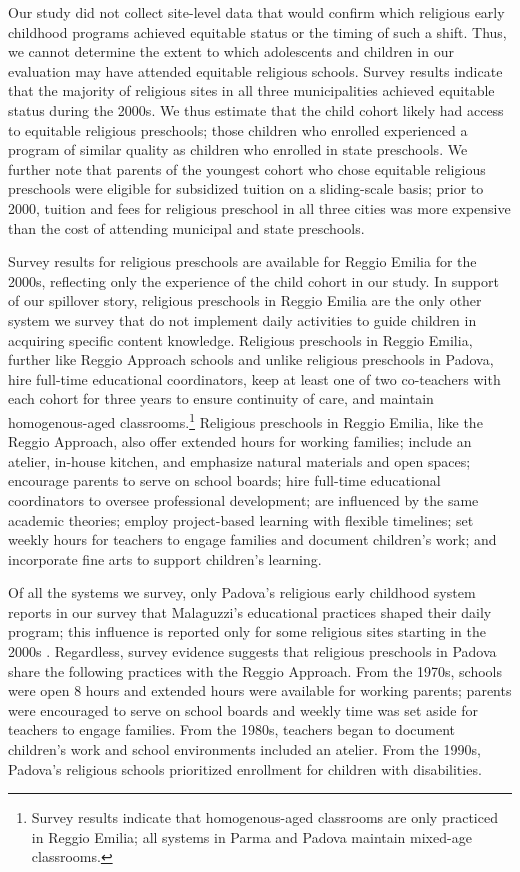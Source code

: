 Our study did not collect site-level data that would confirm which religious early childhood programs achieved equitable status or the timing of such a shift. Thus, we cannot determine the extent to which adolescents and children in our evaluation may have attended equitable religious schools. Survey results indicate that the majority of religious sites in all three municipalities achieved equitable status during the 2000s. We thus estimate that the child cohort likely had access to equitable religious preschools; those children who enrolled experienced a program of similar quality as children who enrolled in state preschools. We further note that parents of the youngest cohort who chose equitable religious preschools were eligible for subsidized tuition on a sliding-scale basis; prior to 2000, tuition and fees for religious preschool in all three cities was more expensive than the cost of attending municipal and state preschools.

Survey results for religious preschools are available for Reggio Emilia for the 2000s, reflecting only the experience of the child cohort in our study. In support of our spillover story, religious preschools in Reggio Emilia are the only other system we survey that do not implement daily activities to guide children in acquiring specific content knowledge. Religious preschools in Reggio Emilia, further like Reggio Approach schools and unlike religious preschools in Padova, hire full-time educational coordinators, keep at least one of two co-teachers with each cohort for three years to ensure continuity of care, and maintain homogenous-aged classrooms.\footnote{Survey results indicate that homogenous-aged classrooms are only practiced in Reggio Emilia; all systems in Parma and Padova maintain mixed-age classrooms.} Religious preschools in Reggio Emilia, like the Reggio Approach, also offer extended hours for working families; include an atelier, in-house kitchen, and emphasize natural materials and open spaces; encourage parents to serve on school boards; hire full-time educational coordinators to oversee professional development; are influenced by the same academic theories; employ project-based learning with flexible timelines; set weekly hours for teachers to engage families and document children's work; and incorporate fine arts to support children's learning.

Of all the systems we survey, only Padova's religious early childhood system reports in our survey that Malaguzzi's educational practices shaped their daily program; this influence is reported only for some religious sites starting in the 2000s  \citep{CEHD_2016_Historical-Analysis}. Regardless, survey evidence suggests that religious preschools in Padova share the following practices with the Reggio Approach. From the 1970s, schools were open 8 hours and extended hours were available for working parents; parents were encouraged to serve on school boards and weekly time was set aside for teachers to engage families. From the 1980s, teachers began to document children's work and school environments included an atelier. From the 1990s, Padova's religious schools prioritized enrollment for children with disabilities.

